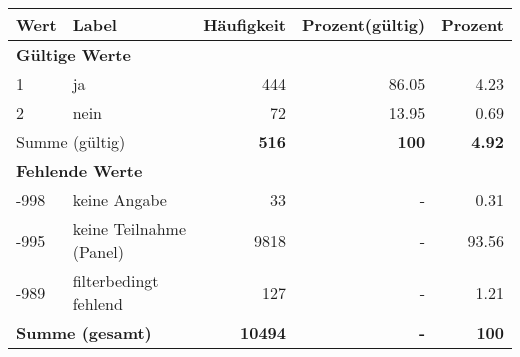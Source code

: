      \begin{longtable}{lXrrr}
     \toprule
     \textbf{Wert} & \textbf{Label} & \textbf{Häufigkeit} & \textbf{Prozent(gültig)} & \textbf{Prozent} \\
     \endhead
     \midrule
     \multicolumn{5}{l}{\textbf{Gültige Werte}}\\

     1 &
     \multicolumn{1}{X}{ ja   } &


       \num{444} &
       \num[round-mode=places,round-precision=2]{86.05} &
         \num[round-mode=places,round-precision=2]{4.23} \\

     2 &
     \multicolumn{1}{X}{ nein   } &


       \num{72} &
       \num[round-mode=places,round-precision=2]{13.95} &
         \num[round-mode=places,round-precision=2]{0.69} \\
     \midrule
     \multicolumn{2}{l}{Summe (gültig)} &
       \textbf{\num{516}} &
     \textbf{\num{100}} &
       \textbf{\num[round-mode=places,round-precision=2]{4.92}} \\
     \multicolumn{5}{l}{\textbf{Fehlende Werte}}\\
       -998 &
       keine Angabe &
         \num{33} &
        - &
         \num[round-mode=places,round-precision=2]{0.31} \\
       -995 &
       keine Teilnahme (Panel) &
         \num{9818} &
        - &
         \num[round-mode=places,round-precision=2]{93.56} \\
       -989 &
       filterbedingt fehlend &
         \num{127} &
        - &
         \num[round-mode=places,round-precision=2]{1.21} \\
     \midrule
     \multicolumn{2}{l}{\textbf{Summe (gesamt)}} &
          \textbf{\num{10494}} &
        \textbf{-} &
        \textbf{\num{100}} \\
     \bottomrule
     \end{longtable}
     
